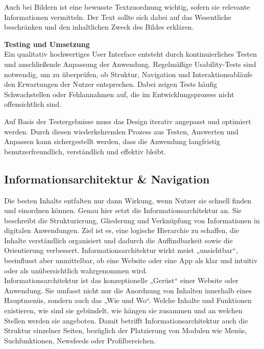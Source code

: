 Auch bei Bildern ist eine bewusste Textzuordnung wichtig, sofern sie relevante Informationen vermitteln. Der Text sollte sich dabei auf das Wesentliche beschränken und den inhaltlichen Zweck des Bildes erklären.\cite{uxmatters} \cite{materialdesign}

\vspace{0.5em}
\textbf{Testing und Umsetzung}\\
Ein qualitativ hochwertiges User Interface entsteht durch kontinuierliches Testen und anschließende Anpassung der Anwendung. Regelmäßige Usability-Tests sind notwendig, um zu überprüfen, ob Struktur, Navigation und Interaktionsabläufe den Erwartungen der Nutzer entsprechen. Dabei zeigen Tests häufig Schwachstellen oder Fehlannahmen auf, die im Entwicklungsprozess nicht offensichtlich sind.

Auf Basis der Testergebnisse muss das Design iterativ angepasst und optimiert werden. Durch diesen wiederkehrenden Prozess aus Testen, Auswerten und Anpassen kann sichergestellt werden, dass die Anwendung langfristig benutzerfreundlich, verständlich und effektiv bleibt.
\vspace{0.5em}


\subsection{Informationsarchitektur \& Navigation}

Die besten Inhalte entfalten nur dann Wirkung, wenn Nutzer sie schnell finden
und einordnen können. Genau hier setzt die Informationsarchitektur an. Sie beschreibt die Strukturierung, 
Gliederung und Verknüpfung von Informationen in digitalen Anwendungen. Ziel ist es, eine 
logische Hierarchie zu schaffen, die Inhalte verständlich organisiert und dadurch die 
Auffindbarkeit sowie die Orientierung verbessert. Informationsarchitektur wirkt meist 
„unsichtbar“, beeinflusst aber unmittelbar, ob eine Website oder eine App als klar und intuitiv 
oder als unübersichtlich wahrgenommen wird. \cite{b13_informationsarchitektur} \cite{eresult_informationsarchitektur}\\

Informationsarchitektur ist das konzeptionelle „Gerüst“ einer Website oder Anwendung. 
Sie umfasst nicht nur die Anordnung von Inhalten innerhalb eines Hauptmenüs, sondern auch das 
„Wie und Wo“. Welche Inhalte und Funktionen existieren, wie sind sie gebündelt, wie hängen 
sie zusammen und an welchen Stellen werden sie angeboten. Damit betrifft Informationsarchitektur
auch die Struktur einzelner Seiten, bezüglich der Platzierung von Modulen wie Menüs, Suchfunktionen,
Newsfeeds oder Profilbereichen. \cite{b13_informationsarchitektur} \cite{eresult_informationsarchitektur}\\

